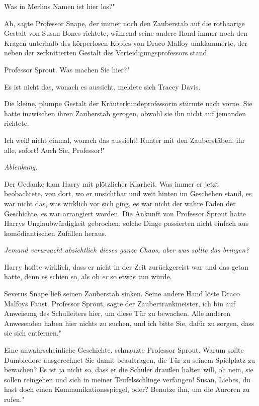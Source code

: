 \glqq Was in Merlins Namen ist hier los?"

\glqq Ah\grqq{}, sagte Professor Snape, der immer noch den Zauberstab auf die
rothaarige Gestalt von Susan Bones richtete, während seine andere Hand immer
noch den Kragen unterhalb des körperlosen Kopfes von Draco Malfoy umklammerte,
der neben der zerknitterten Gestalt des Verteidigungsprofessors stand.

\glqq Professor Sprout. Was machen Sie hier?"

\glqq Es ist nicht das, wonach es aussieht\grqq{}, meldete sich Tracey Davis.

Die kleine, plumpe Gestalt der Kräuterkundeprofessorin stürmte nach vorne. Sie
hatte inzwischen ihren Zauberstab gezogen, obwohl sie ihn nicht auf jemanden
richtete.

\glqq Ich weiß nicht einmal, wonach das aussieht! Runter mit den Zauberstäben,
ihr alle, sofort! Auch Sie, Professor!"

\emph{Ablenkung.}

Der Gedanke kam Harry mit plötzlicher Klarheit. Was immer er jetzt beobachtete,
von dort, wo er unsichtbar und weit hinten im Geschehen stand, es war nicht das,
was wirklich vor sich ging, es war nicht der wahre Faden der Geschichte, es war
arrangiert worden. Die Ankunft von Professor Sprout hatte Harrys
Unglaubwürdigkeit gebrochen; solche Dinge passierten nicht einfach aus
komödiantischen Zufällen heraus.

\emph{Jemand verursacht absichtlich dieses ganze Chaos, aber was sollte das bringen?}

Harry hoffte wirklich, dass er nicht in der Zeit zurückgereist war und das getan
hatte, denn es schien so, als ob \emph{er} so etwas tun würde.

Severus Snape ließ seinen Zauberstab sinken. Seine andere Hand löste Draco
Malfoys Faust. \glqq Professor Sprout\grqq{}, sagte der Zaubertrankmeister,
\glqq ich bin auf Anweisung des Schulleiters hier, um diese Tür zu bewachen.
Alle anderen Anwesenden haben hier nichts zu suchen, und ich bitte Sie, dafür zu
sorgen, dass sie sich entfernen."

\glqq Eine unwahrscheinliche Geschichte\grqq{}, schnauzte Professor Sprout.
\glqq Warum sollte Dumbledore ausgerechnet Sie damit beauftragen, die Tür zu
seinem Spielplatz zu bewachen? Es ist ja nicht so, dass er die Schüler draußen
halten will, oh nein, sie sollen reingehen und sich in meiner Teufelsschlinge
verfangen! Susan, Liebes, du hast doch einen Kommunikationsspiegel, oder?
Benutze ihn, um die Auroren zu rufen."


